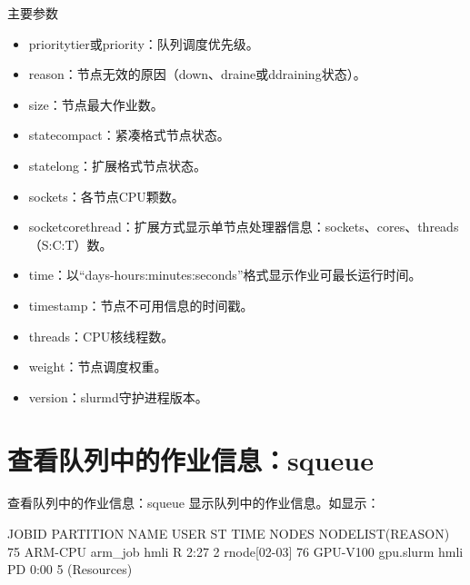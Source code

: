 \begin{frame}{主要参数}
\begin{itemize}
\begin{itemize}
\begin{itemize}
   	\item prioritytier或priority：队列调度优先级。
   	\item reason：节点无效的原因（down、draine或ddraining状态）。
   	\item size：节点最大作业数。
   	\item statecompact：紧凑格式节点状态。
   	\item statelong：扩展格式节点状态。
   	\item sockets：各节点CPU颗数。
   	\item socketcorethread：扩展方式显示单节点处理器信息：sockets、cores、threads（S:C:T）数。
   	\item time：以``days-hours:minutes:seconds''格式显示作业可最长运行时间。
   	\item timestamp：节点不可用信息的时间戳。
   	\item threads：CPU核线程数。
   	\item weight：节点调度权重。
   	\item version：slurmd守护进程版本。
\end{itemize}
\end{itemize}
\end{itemize}
\end{frame}

\section{查看队列中的作业信息：squeue}
\begin{frame}[fragile=singleslide]{查看队列中的作业信息：squeue}
显示队列中的作业信息。如显示：
\begin{OUT}
JOBID PARTITION      NAME     USER ST       TIME  NODES NODELIST(REASON)
   75   ARM-CPU   arm_job     hmli  R       2:27      2 rnode[02-03]
   76  GPU-V100 gpu.slurm     hmli PD       0:00      5 (Resources)
\end{OUT}
\end{frame}

